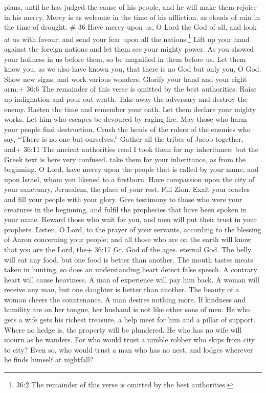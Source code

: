 plans, until he has judged the cause of his people, and he will make
them rejoice in his mercy.  Mercy is as welcome in the time
of his affliction, as clouds of rain in the time of drought. \# 36
 Have mercy upon us, O Lord the God of all, and look at us
with favour;  and send your fear upon all the
nations.\footnote{36:2 The remainder of this verse is omitted by the
  best authorities.}  Lift up your hand against the foreign
nations and let them see your mighty power.  As you showed
your holiness in us before them, so be magnified in them before us.
 Let them know you, as we also have known you, that there is
no God but only you, O God.  Show new signs, and work
various wonders. Glorify your hand and your right arm.+ 36:6 The
remainder of this verse is omitted by the best authorities. 
Raise up indignation and pour out wrath. Take away the adversary and
destroy the enemy.  Hasten the time and remember your oath.
Let them declare your mighty works.  Let him who escapes be
devoured by raging fire. May those who harm your people find
destruction.  Crush the heads of the rulers of the enemies
who say, ``There is no one but ourselves.''  Gather all the
tribes of Jacob together, and+ 36:11 The ancient authorities read I took
them for my inheritance: but the Greek text is here very confused. take
them for your inheritance, as from the beginning.  O Lord,
have mercy upon the people that is called by your name, and upon Israel,
whom you likened to a firstborn.  Have compassion upon the
city of your sanctuary, Jerusalem, the place of your rest. 
Fill Zion. Exalt your oracles and fill your people with your glory.
 Give testimony to those who were your creatures in the
beginning, and fulfil the prophecies that have been spoken in your name.
 Reward those who wait for you, and men will put their
trust in your prophets.  Listen, O Lord, to the prayer of
your servants, according to the blessing of Aaron concerning your
people; and all those who are on the earth will know that you are the
Lord, the+ 36:17 Gr. God of the ages. eternal God.  The
belly will eat any food, but one food is better than another.
 The mouth tastes meats taken in hunting, so does an
understanding heart detect false speech.  A contrary heart
will cause heaviness. A man of experience will pay him back.
 A woman will receive any man, but one daughter is better
than another.  The beauty of a woman cheers the
countenance. A man desires nothing more.  If kindness and
humility are on her tongue, her husband is not like other sons of men.
 He who gets a wife gets his richest treasure, a help meet
for him and a pillar of support.  Where no hedge is, the
property will be plundered. He who has no wife will mourn as he wanders.
 For who would trust a nimble robber who skips from city to
city? Even so, who would trust a man who has no nest, and lodges
wherever he finds himself at nightfall?

